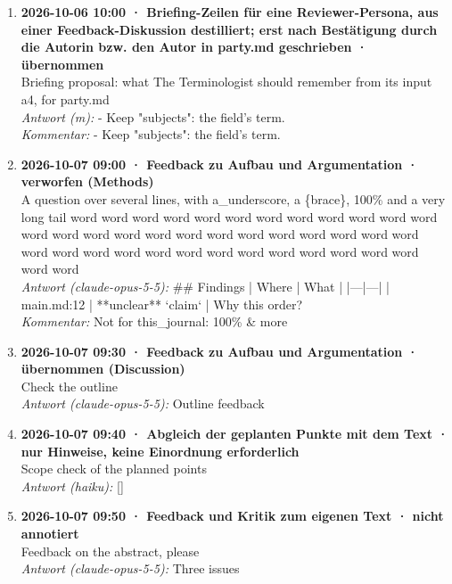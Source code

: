 \begin{enumerate}
  \\ \textit{Antwort (m):} The Terminologist concedes for psychology.
  \item \textbf{2026-10-06 10:00 · Briefing-Zeilen für eine Reviewer-Persona, aus einer Feedback-Diskussion destilliert; erst nach Bestätigung durch die Autorin bzw. den Autor in party.md geschrieben · übernommen} \\
  Briefing proposal: what The Terminologist should remember from its input a4, for party.md
  \\ \textit{Antwort (m):} - Keep "subjects": the field's term.
  \\ \textit{Kommentar:} - Keep "subjects": the field's term.
  \item \textbf{2026-10-07 09:00 · Feedback zu Aufbau und Argumentation · verworfen (Methods)} \\
  A question over several lines, with a\_underscore, a \{brace\}, 100\% and a very long tail word word word word word word word word word word word word word word word word word word word word word word word word word word word word word word word word word word word word word word word word
  \\ \textit{Antwort (claude-opus-5-5):} \#\# Findings | Where | What | |---|---| | main.md:12 | **unclear** `claim` | Why this order?
  \\ \textit{Kommentar:} Not for this\_journal: 100\% \& more
  \item \textbf{2026-10-07 09:30 · Feedback zu Aufbau und Argumentation · übernommen (Discussion)} \\
  Check the outline
  \\ \textit{Antwort (claude-opus-5-5):} Outline feedback
  \item \textbf{2026-10-07 09:40 · Abgleich der geplanten Punkte mit dem Text · nur Hinweise, keine Einordnung erforderlich} \\
  Scope check of the planned points
  \\ \textit{Antwort (haiku):} []
  \item \textbf{2026-10-07 09:50 · Feedback und Kritik zum eigenen Text · nicht annotiert} \\
  Feedback on the abstract, please
  \\ \textit{Antwort (claude-opus-5-5):} Three issues
\end{enumerate}
